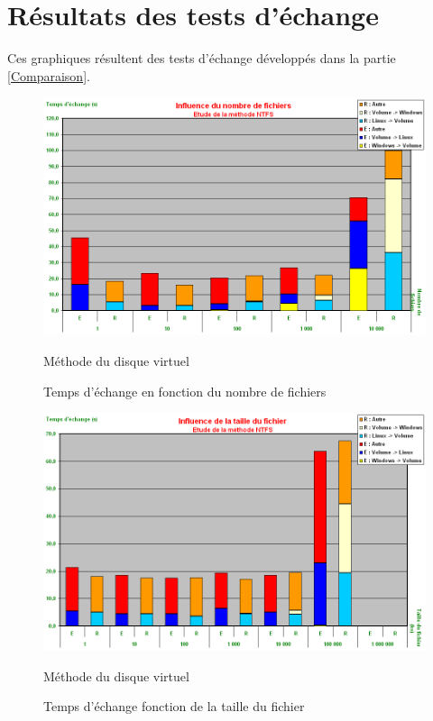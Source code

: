 
\section{Résultats des tests d'échange}

Ces graphiques résultent des tests d'échange développés dans la partie \ref{Comparaison}.
\\


\begin{figure}[!h]
	\center
	\includegraphics[scale=0.4]{images/tests/nombre_NTFS.png}
	\caption{Temps d'échange en fonction du nombre de fichiers}
	Méthode du disque virtuel
\end{figure}

\begin{figure}[!h]
	\center
	\includegraphics[scale=0.4]{images/tests/taille_NTFS.png}
	\caption{Temps d'échange fonction de la taille du fichier}
	Méthode du disque virtuel
\end{figure}

